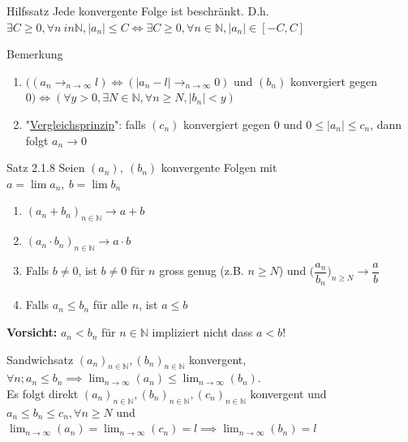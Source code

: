 \documentclass[a4paper,10pt]{article}
\begin{document}
\begin{tbox} {Hilfssatz}
Jede konvergente Folge ist beschränkt. D.h. $\exists C \ge 0, \forall n \ in \mathbb{N}, |a_n|\le C\iff \exists C \ge 0, \forall n \in \mathbb{N}, |a_n|\in [-C,C]$
\end{tbox}
\begin{bembox}{Bemerkung}
    \begin{enumerate}
        \item $\big((a_n\longrightarrow_{n\to\infty} l) \iff (|a_n-l|\longrightarrow_{n\to\infty} 0)$ und $(b_n)$ konvergiert gegen $0\big)\iff (\forall y > 0, \exists N \in \mathbb{N}, \forall n\ge N, |b_n|<y)$
        \item "\underline{Vergleichsprinzip}": falls $(c_n)$ konvergiert gegen $0$ und $0\le |a_n| \le c_n$, dann folgt $a_n\longrightarrow 0$
    \end{enumerate}
\end{bembox}
\begin{tbox}{Satz 2.1.8}
    Seien $(a_n), \ (b_n) $ konvergente Folgen mit \\$a=\lim a_n, \ b= \lim b_n$
     \begin{enumerate}
         \item $(a_n+b_n)_{n\in\mathbb{N}} \longrightarrow a+b$ 
         \item $(a_n\cdot b_n)_{n\in \mathbb N} \longrightarrow a\cdot b$ 
         \item Falls $b\neq 0$, ist $b\neq 0$ für $n$ gross genug (z.B. $n\ge N$) und $\bigg(\dfrac {a_n} {b_n}\bigg)_{n\ge N}\longrightarrow \dfrac a b $
         \item Falls $a_n\le b_n$ für alle $n$, ist $a\le b$
     \end{enumerate}
\end{tbox}
\begin{flushleft}
\textbf{Vorsicht: } $a_n<b_n$ für $n\in \mathbb N$ impliziert nicht dass $a<b$!
\end{flushleft}

\begin{tbox}{Sandwichsatz}
$(a_n)_{n\in\mathbb N}, (b_n)_{n\in\mathbb N}$ konvergent, $\forall n; a_n\le b_n \implies \lim_{n\to\infty} (a_n)\le \lim_{n\to\infty}(b_n)$. \\Es folgt direkt $(a_n)_{n\in\mathbb{N}},(b_n)_{n\in\mathbb{N}}, (c_n)_{n\in\mathbb{N}}$ konvergent und $a_n\le b_n \le c_n, \forall n \ge N$ und $\lim_{n\to\infty}(a_n)=\lim_{n\to\infty}(c_n)=l\implies \lim_{n\to\infty}(b_n)=l$
    
\end{tbox}
\end{document}
